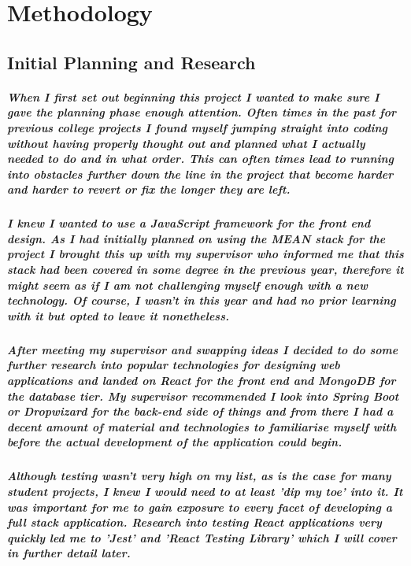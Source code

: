 \chapter{Methodology}
\section{Initial Planning and Research}
\paragraph{When I first set out beginning this project I wanted to make sure I gave the planning phase enough attention. Often times in the past for previous college projects I found myself jumping straight into coding without having properly thought out and planned what I actually needed to do and in what order. This can often times lead to running into obstacles further down the line in the project that become harder and harder to revert or fix the longer they are left.}
\paragraph{I knew I wanted to use a JavaScript framework for the front end design. As I had initially planned on using the MEAN stack for the project I brought this up with my supervisor who informed me that this stack had been covered in some degree in the previous year, therefore it might seem as if I am not challenging myself enough with a new technology. Of course, I wasn't in this year and had no prior learning with it but opted to leave it nonetheless.}
\paragraph{After meeting my supervisor and swapping ideas I decided to do some further research into popular technologies for designing web applications and landed on React for the front end and MongoDB for the database tier. My supervisor recommended I look into Spring Boot or Dropwizard for the back-end side of things and from there I had a decent amount of material and technologies to familiarise myself with before the actual development of the application could begin.}
\paragraph{Although testing wasn't very high on my list, as is the case for many student projects, I knew I would need to at least 'dip my toe' into it. It was important for me to gain exposure to every facet of developing a full stack application. Research into testing React applications very quickly led me to 'Jest' and 'React Testing Library' which I will cover in further detail later.}


